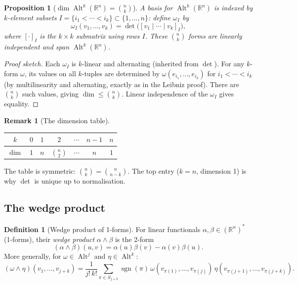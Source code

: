 \documentclass[11pt]{article}
\theoremstyle{definition}
\newtheorem{definition}{Definition}[section]
\newtheorem{remark}{Remark}[section]
\theoremstyle{plain}
\newtheorem{proposition}{Proposition}[section]
\begin{document}
\begin{proposition}[$\dim\operatorname{Alt}^k(\mathbb{R}^n) = \binom{n}{k}$]
\label{prop:dim-alt}
  A basis for $\operatorname{Alt}^k(\mathbb{R}^n)$ is indexed by
  $k$-element subsets $I = \{i_1 < \cdots < i_k\}\subset\{1,\ldots,n\}$:
  define $\omega_I$ by
  \[
    \omega_I(v_1,\ldots,v_k)
    = \det\bigl([v_1\mid\cdots\mid v_k]_I\bigr),
  \]
  where $[\cdot]_I$ is the $k\times k$ submatrix using rows $I$.
  These $\binom{n}{k}$ forms are linearly independent and span
  $\operatorname{Alt}^k(\mathbb{R}^n)$.
\end{proposition}
\begin{proof}[Proof sketch]
  Each $\omega_I$ is $k$-linear and alternating (inherited from $\det$).
  For any $k$-form $\omega$, its values on all $k$-tuples are determined
  by $\omega(e_{i_1},\ldots,e_{i_k})$ for $i_1<\cdots<i_k$ (by
  multilinearity and alternating, exactly as in the Leibniz proof).
  There are $\binom{n}{k}$ such values, giving $\dim\le\binom{n}{k}$.
  Linear independence of the $\omega_I$ gives equality.
\end{proof}

\begin{remark}[The dimension table]
  \begin{center}
  \renewcommand{\arraystretch}{1.3}
  \begin{tabular}{c|cccccc}
    $k$ & $0$ & $1$ & $2$ & $\cdots$ & $n-1$ & $n$ \\\hline
    $\dim$ & $1$ & $n$ & $\binom{n}{2}$ & $\cdots$ & $n$ & $1$
  \end{tabular}
  \end{center}
  The table is symmetric: $\binom{n}{k}=\binom{n}{n-k}$.  The top entry
  ($k=n$, dimension 1) is why $\det$ is unique up to normalisation.
\end{remark}

\subsection{The wedge product}

\begin{definition}[Wedge product of 1-forms]
  For linear functionals $\alpha,\beta\in(\mathbb{R}^n)^*$ (1-forms),
  their \emph{wedge product} $\alpha\wedge\beta$ is the 2-form
  \[
    (\alpha\wedge\beta)(u,v)
    = \alpha(u)\beta(v) - \alpha(v)\beta(u).
  \]
  More generally, for $\omega\in\operatorname{Alt}^j$ and
  $\eta\in\operatorname{Alt}^k$:
  \[
    (\omega\wedge\eta)(v_1,\ldots,v_{j+k})
    = \frac{1}{j!\,k!}
      \sum_{\pi\in S_{j+k}}\operatorname{sgn}(\pi)\,
      \omega(v_{\pi(1)},\ldots,v_{\pi(j)})\,
      \eta(v_{\pi(j+1)},\ldots,v_{\pi(j+k)}).
  \]
\end{definition}
\end{document}
